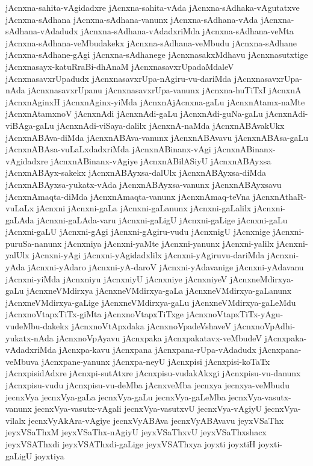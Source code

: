 {jAcnxna-sahita-vAgidadxre
jAcnxna-sahita-vAda
jAcnxna-sAdhaka-vAgutatxve
jAcnxna-sAdhana
jAcnxna-sAdhana-vanunx
jAcnxna-sAdhana-vAda
jAcnxna-sAdhana-vAdadudx
jAcnxna-sAdhana-vAdadxriMda
jAcnxna-sAdhana-veMta
jAcnxna-sAdhana-veMbudakekx
jAcnxna-sAdhana-veMbudu
jAcnxna-sAdhane
jAcnxna-sAdhane-gAgi
jAcnxna-sAdhanege
jAcnxnasakxMdhavu
jAcnxnasutxtige
jAcnxnasayx-katuRraBi-dhAnaM
jAcnxnasavxrUpadaMdaleV
jAcnxnasavxrUpadudx
jAcnxnasavxrUpa-nAgiru-vu-dariMda
jAcnxnasavxrUpa-nAda
jAcnxnasavxrUpanu
jAcnxnasavxrUpa-vanunx
jAcnxna-huTiTxI
jAcnxnA
jAcnxnAginxH
jAcnxnAginx-yiMda
jAcnxnAjAcnxna-gaLu
jAcnxnAtamx-naMte
jAcnxnAtamxnoV
jAcnxnAdi
jAcnxnAdi-gaLu
jAcnxnAdi-guNa-gaLu
jAcnxnAdi-viBAga-gaLu
jAcnxnAdi-viSaya-dalilx
jAcnxnA-naMda
jAcnxnABAvakUkx
jAcnxnABAva-diMda
jAcnxnABAva-vanunx
jAcnxnABAvavu
jAcnxnABAsa-gaLu
jAcnxnABAsa-vuLaLxdadxriMda
jAcnxnABinanx-vAgi
jAcnxnABinanx-vAgidadxre
jAcnxnABinanx-vAgiye
jAcnxnABilASiyU
jAcnxnABAyxsa
jAcnxnABAyx-sakekx
jAcnxnABAyxsa-dalUlx
jAcnxnABAyxsa-diMda
jAcnxnABAyxsa-yukatx-vAda
jAcnxnABAyxsa-vanunx
jAcnxnABAyxsavu
jAcnxnAmaqta-diMda
jAcnxnAmaqta-vanunx
jAcnxnAmaq-teVna
jAcnxnAthaR-vuLaLx
jAcnxni
jAcnxni-gaLa
jAcnxni-gaLanunx
jAcnxni-gaLalilx
jAcnxni-gaLAda
jAcnxni-gaLAda-varu
jAcnxni-gaLigU
jAcnxni-gaLige
jAcnxni-gaLu
jAcnxni-gaLU
jAcnxni-gAgi
jAcnxni-gAgiru-vudu
jAcnxnigU
jAcnxnige
jAcnxni-puruSa-nanunx
jAcnxniya
jAcnxni-yaMte
jAcnxni-yanunx
jAcnxni-yalilx
jAcnxni-yalUlx
jAcnxni-yAgi
jAcnxni-yAgidadxlilx
jAcnxni-yAgiruvu-dariMda
jAcnxni-yAda
jAcnxni-yAdaro
jAcnxni-yA-daroV
jAcnxni-yAdavanige
jAcnxni-yAdavanu
jAcnxni-yiMda
jAcnxniyu
jAcnxniyU
jAcnxniye
jAcnxniyeV
jAcnxneMdirxya-gaLu
jAcnxneVMdirxya
jAcnxneVMdirxya-gaLa
jAcnxneVMdirxya-gaLanunx
jAcnxneVMdirxya-gaLige
jAcnxneVMdirxya-gaLu
jAcnxneVMdirxya-gaLeMdu
jAcnxnoVtapxTiTx-giMta
jAcnxnoVtapxTiTxge
jAcnxnoVtapxTiTx-yAgu-vudeMbu-dakekx
jAcnxnoVtApxdaka
jAcnxnoVpadeVshaveV
jAcnxnoVpAdhi-yukatx-nAda
jAcnxnoVpAyavu
jAcnxpaka
jAcnxpakatavx-veMbudeV
jAcnxpaka-vAdadxriMda
jAcnxpa-kavu
jAcnxpana
jAcnxpana-rUpa-vAdadudx
jAcnxpana-veMbuva
jAcnxpane-yanunx
jAcnxpa-neyU
jAcnxpisi
jAcnxpisi-koTaTx
jAcnxpisidAdxre
jAcnxpi-sutAtxre
jAcnxpisu-vudakAkxgi
jAcnxpisu-vu-danunx
jAcnxpisu-vudu
jAcnxpisu-vu-deMba
jAcnxveMba
jecnxya
jecnxya-veMbudu
jecnxVya
jecnxVya-gaLa
jecnxVya-gaLu
jecnxVya-gaLeMba
jecnxVya-vasutx-vanunx
jecnxVya-vasutx-vAgali
jecnxVya-vasutxvU
jecnxVya-vAgiyU
jecnxVya-vilalx
jecnxVyAkAra-vAgiye
jecnxVyABAva
jecnxVyABAvavu
jeyxVSaThx
jeyxVSaThxM
jeyxVSaThx-nAgiyU
jeyxVSaThxvU
jeyxVSaThxshacx
jeyxVSAThxdi
jeyxVSAThxdi-gaLige
jeyxVSAThxya
joyxti
joyxtiH
joyxti-gaLigU
joyxtiya
}
